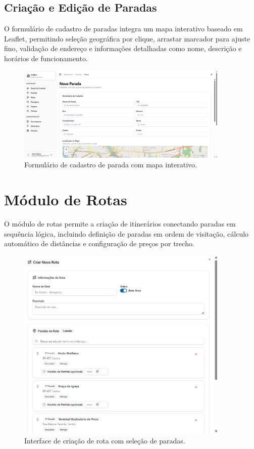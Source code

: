 \subsection{Criação e Edição de Paradas}

O formulário de cadastro de paradas integra um mapa interativo baseado em Leaflet, permitindo seleção geográfica por clique, arrastar marcador para ajuste fino, validação de endereço e informações detalhadas como nome, descrição e horários de funcionamento.

\begin{figure}[H]
  \centering
  \includegraphics[width=0.9\textwidth]{imagens/formulario-parada.png}
  \caption{Formulário de cadastro de parada com mapa interativo.}
  \label{fig:formulario-parada}
\end{figure}

\section{Módulo de Rotas}

O módulo de rotas permite a criação de itinerários conectando paradas em sequência lógica, incluindo definição de paradas em ordem de visitação, cálculo automático de distâncias e configuração de preços por trecho.

\begin{figure}[H]
  \centering
  \includegraphics[width=0.9\textwidth]{imagens/criacao-rota.png}
  \caption{Interface de criação de rota com seleção de paradas.}
  \label{fig:criacao-rota}
\end{figure}


